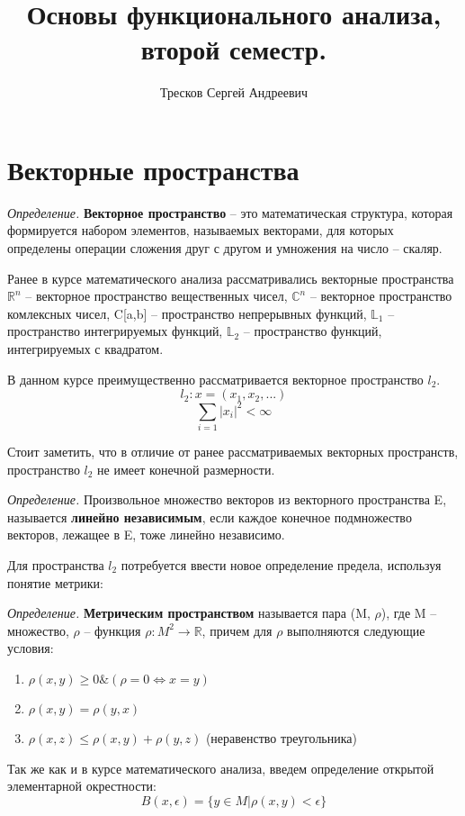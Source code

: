 \documentclass[12pt]{article}
\newcommand{\equals}{\Leftrightarrow}
\newcommand{\defi}{{\itshape Определение. }}
\renewcommand{\leq}{\leqslant}
\renewcommand{\geq}{\geqslant}
\begin{document}
	\title{Основы функционального анализа, второй семестр.}
	\author{Тресков Сергей Андреевич}
	\maketitle
	
	\section{Векторные пространства}
	
	\defi \textbf{Векторное пространство} -- это математическая структура, которая формируется набором элементов, называемых векторами, для 
	которых 	определены операции сложения друг с другом и умножения на число -- скаляр.
	
	Ранее в курсе математического анализа рассматривались векторные пространства $\mathbb{R}^n$ -- векторное пространство вещественных
	чисел, $\mathbb{C}^n$ -- векторное пространство комлексных чисел, C[a,b] -- пространство непрерывных функций, $\mathbb{L}_1$ -- 
	пространство интегрируемых функций, $\mathbb{L}_2$ -- пространство функций, интегрируемых с квадратом.
	
	В данном курсе преимущественно рассматривается векторное пространство $l_2$.
	$$l_2 : x = (x_1, x_2, ...)$$
	$$\sum_{i=1} |x_i|^2 < \infty$$

	Стоит заметить, что в отличие от ранее рассматриваемых векторных пространств, пространство $l_2$ не имеет конечной размерности.
	
	\defi Произвольное множество векторов из векторного пространства E, называется \textbf{линейно независимым}, если каждое конечное
	подмножество векторов, лежащее в E, тоже линейно независимо.
	
	Для пространства $l_2$ потребуется ввести новое определение предела, используя понятие метрики:
	
	\defi \textbf{Метрическим пространством} называется пара (M, $\rho$), где M -- множество, $\rho$ -- функция $\rho : M^2 \rightarrow 
	\mathbb{R}$, причем для $\rho$ выполняются следующие условия:
	\begin{enumerate}
		\item $\rho(x,y) \geq 0 \& (\rho = 0 \equals x=y)$
		\item $\rho(x,y) = \rho(y,x)$
		\item $\rho(x,z) \leq \rho(x,y) + \rho(y,z)$ (неравенство треугольника)
	\end{enumerate}
	
	Так же как и в курсе математического анализа, введем определение открытой элементарной окрестности:
	$$B(x, \epsilon) = \{y \in M | \rho(x,y) < \epsilon\}$$
	
\end{document}
